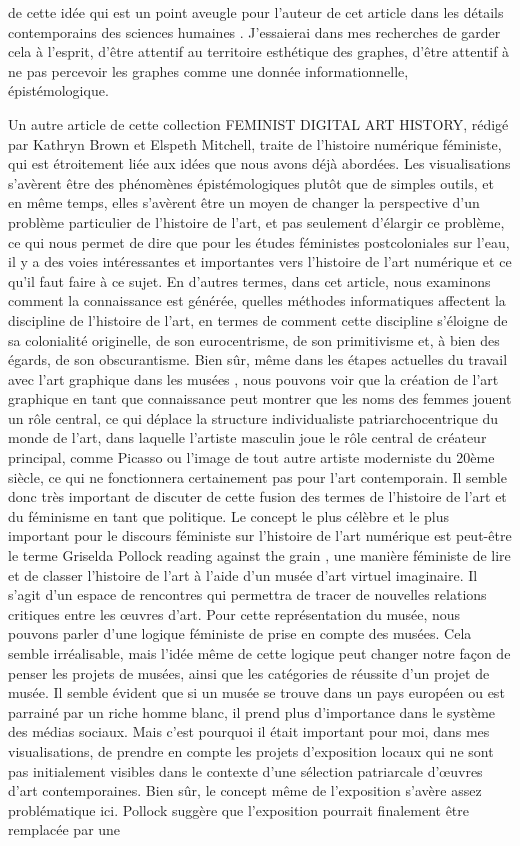 \documentclass[a4paper, twoside, 12pt]{book}
\begin{document}
de cette idée qui est un point aveugle pour l'auteur de cet article dans les détails contemporains des sciences humaines . J'essaierai dans mes recherches de garder cela à l'esprit, d'être attentif au territoire esthétique des graphes, d'être attentif à ne pas percevoir les graphes comme une donnée informationnelle, épistémologique.

Un autre article de cette collection FEMINIST DIGITAL ART HISTORY, rédigé par Kathryn Brown et Elspeth Mitchell, traite de l'histoire numérique féministe, qui est étroitement liée aux idées que nous avons déjà abordées. Les visualisations s'avèrent être des phénomènes épistémologiques plutôt que de simples outils, et en même temps, elles s'avèrent être un moyen de changer la perspective d'un problème particulier de l'histoire de l'art, et pas seulement d'élargir ce problème, ce qui nous permet de dire que pour les études féministes postcoloniales sur l'eau, il y a des voies intéressantes et importantes vers l'histoire de l'art numérique et ce qu'il faut faire à ce sujet. En d'autres termes, dans cet article, nous examinons comment la connaissance est générée, quelles méthodes informatiques affectent la discipline de l'histoire de l'art, en termes de comment cette discipline s'éloigne de sa colonialité originelle, de son eurocentrisme, de son primitivisme et, à bien des égards, de son obscurantisme.  Bien sûr, même dans les étapes actuelles du travail avec l'art graphique dans les musées , nous pouvons voir que la création de l'art graphique en tant que connaissance peut montrer que les noms des femmes jouent un rôle central, ce qui déplace la structure individualiste patriarchocentrique du monde de l'art, dans laquelle l'artiste masculin joue le rôle central de créateur principal, comme Picasso ou l'image de tout autre artiste moderniste du 20ème siècle, ce qui ne fonctionnera certainement pas pour l'art contemporain. Il semble donc très important de discuter de cette fusion des termes de l'histoire de l'art et du féminisme en tant que politique. Le concept le plus célèbre et le plus important pour le discours féministe sur l'histoire de l'art numérique est peut-être le terme Griselda Pollock reading against the grain , une manière féministe de lire et de classer l'histoire de l'art à l'aide d'un musée d'art virtuel imaginaire. Il s'agit d'un espace de rencontres qui permettra de tracer de nouvelles relations critiques entre les œuvres d'art. Pour cette représentation du musée, nous pouvons parler d'une logique féministe de prise en compte des musées. Cela semble irréalisable, mais l'idée même de cette logique peut changer notre façon de penser les projets de musées, ainsi que les catégories de réussite d'un projet de musée. Il semble évident que si un musée se trouve dans un pays européen ou est parrainé par un riche homme blanc, il prend plus d'importance dans le système des médias sociaux. Mais c'est pourquoi il était important pour moi, dans mes visualisations, de prendre en compte les projets d'exposition locaux qui ne sont pas initialement visibles dans le contexte d'une sélection patriarcale d'œuvres d'art contemporaines. Bien sûr, le concept même de l'exposition s'avère assez problématique ici. Pollock suggère que l'exposition pourrait finalement être remplacée par une 
\end{document}
